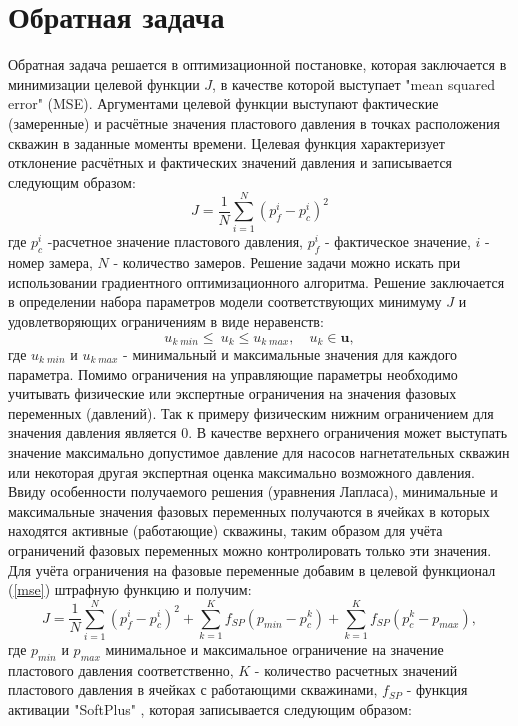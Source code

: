 \documentclass[14pt]{article}
\begin{document}
\section{Обратная задача}
Обратная задача решается в оптимизационной постановке, которая заключается в минимизации целевой функции $J$, в качестве которой выступает "mean squared error" (MSE). Аргументами целевой функции выступают фактические (замеренные) и расчётные значения пластового давления в точках расположения скважин в заданные моменты времени. Целевая функция характеризует отклонение расчётных и фактических значений давления и записывается следующим образом:
\begin{equation} \label{mse}
J=\frac{1}{N}\sum_{i=1}^N{\left(p_f^i-p_c^i\right)^2}
\end{equation}
где $p_c^i$ -расчетное значение пластового давления, $p_f^i$ - фактическое значение, $i$ - номер замера, $N$ - количество замеров. Решение задачи можно искать при использовании градиентного оптимизационного алгоритма. Решение заключается в определении набора параметров модели соответствующих минимуму $J$ и удовлетворяющих ограничениям в виде неравенств:
\begin{equation} \label{ubnd}
u_{k\;min}\leq\ u_k\leq u_{k\;max}, \quad u_k \in \boldsymbol{u},
\end{equation}
где $u_{k\;min}$ и $u_{k\;max}$ - минимальный и максимальные значения для каждого параметра. Помимо ограничения на управляющие параметры необходимо учитывать физические или экспертные ограничения на значения фазовых переменных (давлений). Так к примеру физическим нижним ограничением для значения давления является 0. В качестве верхнего ограничения может выступать значение максимально допустимое давление для насосов нагнетательных скважин или некоторая другая экспертная оценка максимально возможного давления. Ввиду особенности получаемого решения (уравнения Лапласа), минимальные и максимальные значения фазовых переменных получаются в ячейках в которых находятся активные (работающие) скважины, таким образом для учёта ограничений фазовых переменных можно контролировать только эти значения. Для учёта ограничения на фазовые переменные добавим в целевой функционал (\ref{mse}) штрафную функцию и получим: 
\begin{equation} \label{mse_bnd_p}
J=\frac{1}{N}\sum_{i=1}^N{\left(p_f^i-p_c^i\right)^2} + \sum_{k=1}^K{f_{SP}(p_{min} - p^k_c)} + \sum_{k=1}^K{f_{SP}(p^k_c-p_{max})},
\end{equation}
где $ p_{min} $ и $ p_{max} $ минимальное и максимальное ограничение на значение пластового давления соответственно, $K$ - количество расчетных значений пластового давления в ячейках с работающими скважинами,  $f_{SP}$ - функция активации "SoftPlus" \cite{Glorot2011}, которая записывается следующим образом:
\end{document}
